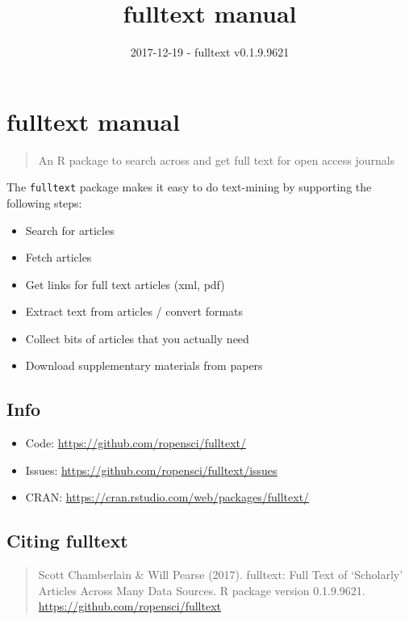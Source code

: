 \documentclass[]{book}
\title{fulltext manual}
\author{}
\date{2017-12-19 - fulltext v0.1.9.9621}
\providecommand{\tightlist}{%
  \setlength{\itemsep}{0pt}\setlength{\parskip}{0pt}}
\theoremstyle{definition}
\theoremstyle{definition}
\theoremstyle{definition}
\theoremstyle{remark}
\begin{document}
\maketitle

{
\setcounter{tocdepth}{1}
\tableofcontents
}
\hypertarget{fulltext-manual}{%
\chapter{fulltext manual}\label{fulltext-manual}}

\begin{quote}
An R package to search across and get full text for open access journals
\end{quote}

The \texttt{fulltext} package makes it easy to do text-mining by
supporting the following steps:

\begin{itemize}
\tightlist
\item
  Search for articles
\item
  Fetch articles
\item
  Get links for full text articles (xml, pdf)
\item
  Extract text from articles / convert formats
\item
  Collect bits of articles that you actually need
\item
  Download supplementary materials from papers
\end{itemize}

\hypertarget{info}{%
\section{Info}\label{info}}

\begin{itemize}
\tightlist
\item
  Code: \url{https://github.com/ropensci/fulltext/}
\item
  Issues: \url{https://github.com/ropensci/fulltext/issues}
\item
  CRAN: \url{https://cran.rstudio.com/web/packages/fulltext/}
\end{itemize}

\hypertarget{citing-fulltext}{%
\section{Citing fulltext}\label{citing-fulltext}}

\begin{quote}
Scott Chamberlain \& Will Pearse (2017). fulltext: Full Text of
`Scholarly' Articles Across Many Data Sources. R package version
0.1.9.9621. \url{https://github.com/ropensci/fulltext}
\end{quote}
\end{document}
